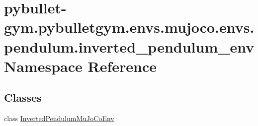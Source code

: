 \hypertarget{namespacepybullet-gym_1_1pybulletgym_1_1envs_1_1mujoco_1_1envs_1_1pendulum_1_1inverted__pendulum__env}{}\section{pybullet-\/gym.pybulletgym.\+envs.\+mujoco.\+envs.\+pendulum.\+inverted\+\_\+pendulum\+\_\+env Namespace Reference}
\label{namespacepybullet-gym_1_1pybulletgym_1_1envs_1_1mujoco_1_1envs_1_1pendulum_1_1inverted__pendulum__env}
\subsection*{Classes}
\begin{DoxyCompactItemize}
\item 
class \hyperlink{classpybullet-gym_1_1pybulletgym_1_1envs_1_1mujoco_1_1envs_1_1pendulum_1_1inverted__pendulum__ene24fa0fbd77b386874ccd6320d672258}{Inverted\+Pendulum\+Mu\+Jo\+Co\+Env}
\end{DoxyCompactItemize}
